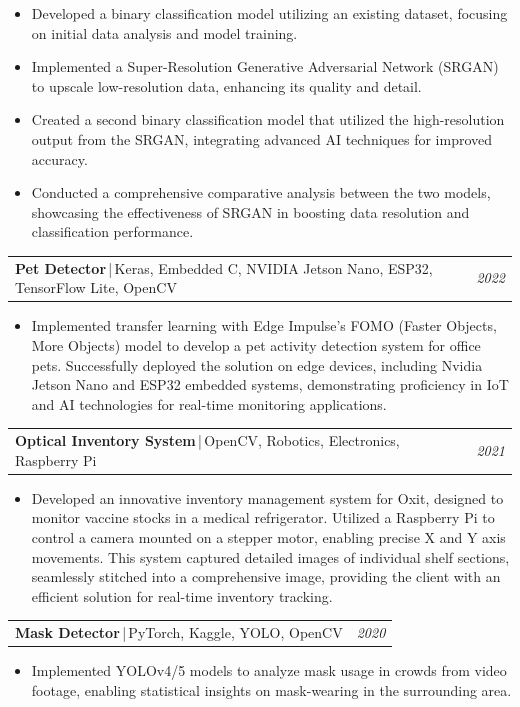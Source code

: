 \documentclass[10pt]{article}
\makeatletter
\newcommand{\projectheading}[3]{%
  \noindent\begin{tabularx}{\textwidth}{@{}X>{\raggedleft\arraybackslash}p{7em}@{}}
    \textbf{\large #1}\,|\,\normalfont #2 & \emph{#3}
  \end{tabularx}\par\nopagebreak
}
\makeatother
\begin{document}
\begin{itemize}
        \item[{\color[RGB]{10,0,254}$\bullet$}] \noindent Developed a binary classification model utilizing an existing dataset, focusing on initial data analysis and model training.
        \item[{\color[RGB]{10,0,254}$\bullet$}] Implemented a Super-Resolution Generative Adversarial Network (SRGAN) to upscale low-resolution data, enhancing its quality and detail.
        \item[{\color[RGB]{10,0,254}$\bullet$}] Created a second binary classification model that utilized the high-resolution output from the SRGAN, integrating advanced AI techniques for improved accuracy.
        \item[{\color[RGB]{10,0,254}$\bullet$}] Conducted a comprehensive comparative analysis between the two models, showcasing the effectiveness of SRGAN in boosting data resolution and classification performance.
	\end{itemize}
\projectheading{Pet Detector}{Keras, Embedded C, NVIDIA Jetson Nano, ESP32, TensorFlow Lite, OpenCV}{2022}
\begin{itemize}
        \item[{\color[RGB]{10,0,254}$\bullet$}] \noindent Implemented transfer learning with Edge Impulse's FOMO (Faster Objects, More Objects) model to develop a pet activity detection system for office pets. Successfully deployed the solution on edge devices, including Nvidia Jetson Nano and ESP32 embedded systems, demonstrating proficiency in IoT and AI technologies for real-time monitoring applications.
	\end{itemize}
\projectheading{Optical Inventory System}{OpenCV, Robotics, Electronics, Raspberry Pi}{2021}
\begin{itemize}
        \item[{\color[RGB]{10,0,254}$\bullet$}] \noindent Developed an innovative inventory management system for Oxit, designed to monitor vaccine stocks in a medical refrigerator. Utilized a Raspberry Pi to control a camera mounted on a stepper motor, enabling precise X and Y axis movements. This system captured detailed images of individual shelf sections, seamlessly stitched into a comprehensive image, providing the client with an efficient solution for real-time inventory tracking.
	\end{itemize}
\projectheading{Mask Detector}{PyTorch, Kaggle, YOLO, OpenCV}{2020}
\begin{itemize}
        \item[{\color[RGB]{10,0,254}$\bullet$}] \noindent Implemented YOLOv4/5 models to analyze mask usage in crowds from video footage, enabling statistical insights on mask-wearing in the surrounding area.
	\end{itemize}
\end{document}
